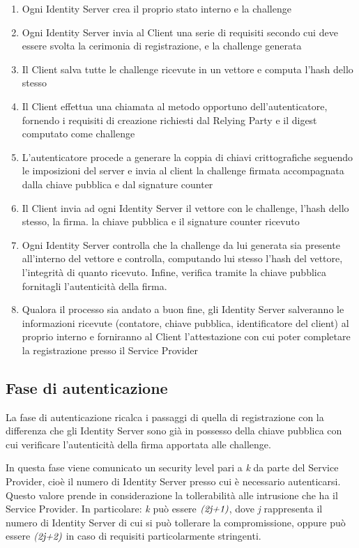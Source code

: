 \begin{enumerate}
	\item Ogni Identity Server crea il proprio stato interno e la challenge
	\item Ogni Identity Server invia al Client una serie di requisiti secondo cui deve essere svolta la cerimonia di registrazione, e la challenge generata
	\item Il Client salva tutte le challenge ricevute in un vettore e computa l'hash dello stesso
	\item Il Client effettua una chiamata al metodo opportuno dell'autenticatore, fornendo i requisiti di creazione richiesti dal Relying Party e il digest computato come challenge
	\item L'autenticatore procede a generare la coppia di chiavi crittografiche seguendo le imposizioni del server e invia al client la challenge firmata accompagnata dalla chiave pubblica e dal signature counter
	\item Il Client invia ad ogni Identity Server il vettore con le challenge, l'hash dello stesso, la firma. la chiave pubblica e il signature counter ricevuto
	\item Ogni Identity Server controlla che la challenge da lui generata sia presente all'interno del vettore e controlla, computando lui stesso l'hash del vettore, l'integrità di quanto ricevuto. Infine, verifica tramite la chiave pubblica fornitagli l'autenticità della firma.
	\item Qualora il processo sia andato a buon fine, gli Identity Server salveranno le informazioni ricevute (contatore, chiave pubblica, identificatore del client) al proprio interno e forniranno al Client l'attestazione con cui poter completare la registrazione presso il Service Provider
\end{enumerate} 

\subsection{Fase di autenticazione}
\label{autenticazione}

La fase di autenticazione ricalca i passaggi di quella di registrazione con la differenza che gli Identity Server sono già in possesso della chiave pubblica con cui verificare l'autenticità della firma apportata alle challenge. 

In questa fase viene comunicato un security level pari a \emph{k} da parte del Service Provider, cioè il numero di Identity Server presso cui è necessario autenticarsi. Questo valore prende in considerazione la tollerabilità alle intrusione che ha il Service Provider. In particolare: \emph{k} può essere $ \emph{(2j+1)} $, dove \emph{j} rappresenta il numero di Identity Server di cui si può tollerare la compromissione, oppure può essere $ \emph{(2j+2)} $ in caso di requisiti particolarmente stringenti. 

